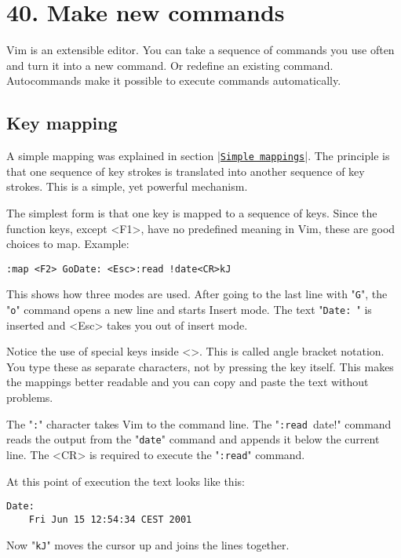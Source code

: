 \section{40. Make new commands}
Vim is an extensible editor.
You can take a sequence of commands you use often and turn it into a new command.
Or redefine an existing command.
Autocommands make it possible to execute commands automatically.
\subsection{Key mapping}
\label{Key mapping}
A simple mapping was explained in section |\hyperref[Simple mappings]{\texttt{Simple mappings}}|.
The principle is that one sequence of key strokes is translated into another sequence of key strokes.
This is a simple, yet powerful mechanism.

The simplest form is that one key is mapped to a sequence of keys.
Since the function keys, except <F1>, have no predefined meaning in Vim, these are good choices to map.
Example:

\begin{Verbatim}[samepage=true]
 :map <F2> GoDate: <Esc>:read !date<CR>kJ
\end{Verbatim}

This shows how three modes are used.
After going to the last line with "\verb!G!", the "\verb!o!" command opens a new line and starts Insert mode.
The text "\verb!Date: !" is inserted and <Esc> takes you out of insert mode.

Notice the use of special keys inside <>.
This is called angle bracket notation.
You type these as separate characters, not by pressing the key itself.
This makes the mappings better readable and you can copy and paste the text without problems.

The "\verb!:!" character takes Vim to the command line.
The "\verb!:read !date!" command reads the output from the "\verb!date!" command and appends it below the current line.
The <CR> is required to execute the "\verb!:read!" command.

At this point of execution the text looks like this:

\begin{Verbatim}[samepage=true]
    Date:  
    Fri Jun 15 12:54:34 CEST 2001 
\end{Verbatim}

Now "\verb!kJ!" moves the cursor up and joins the lines together.

